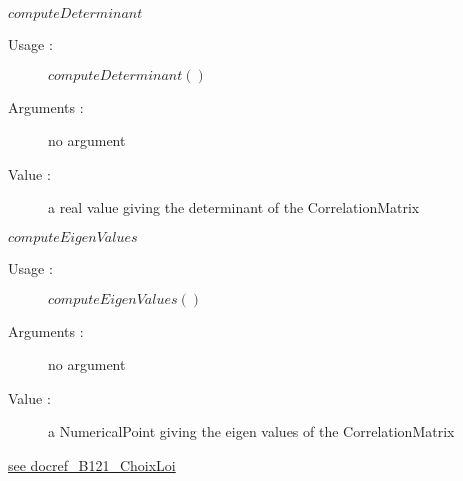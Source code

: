 \begin{description}
\begin{description}
  \item $computeDeterminant$
    \begin{description}
    \item[Usage :] $computeDeterminant()$
    \item[Arguments :] no argument
    \item[Value :] a real value giving the determinant of the CorrelationMatrix
    \end{description}
    \bigskip

  \item $computeEigenValues$
    \begin{description}
    \item[Usage :] $computeEigenValues()$
    \item[Arguments :] no argument
    \item[Value :] a NumericalPoint giving the eigen values of the CorrelationMatrix
    \end{description}
    \bigskip
  \end{description}

\item[Links :]  \rule{0pt}{1em}
  \href{./Version/docref_B121_ChoixLoi.pdf}{see docref\_B121\_ChoixLoi}
\end{description}

